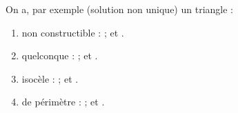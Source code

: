    On a, par exemple (solution non unique) un triangle :
   \begin{enumerate}
      \item non constructible : {\blue {} ;  et }.
      \item quelconque : {\blue {} ;  et }.
      \item isocèle : {\blue {} ;  et }.
      \item de périmètre  : {\blue {} ;  et }.
   \end{enumerate}
